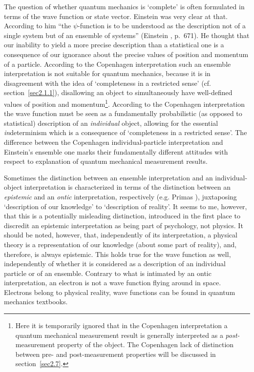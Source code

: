 \documentclass[12pt]{article}
\begin{document}
The question of whether quantum mechanics is `complete' is often
formulated in terms of the wave function or state vector. Einstein
was very clear at that. According to him ``the $\psi$-function is
to be understood as the description not of a single system but of
an ensemble of systems'' (Einstein \cite{Einstein82}, p.~671). He
thought that our inability to yield a more precise description
than a statistical one is a consequence of our ignorance about the
precise values of position and momentum of a particle. According
to the Copenhagen interpretation such an ensemble interpretation
is not suitable for quantum mechanics, because it is in
disagreement with the idea of `completeness in a restricted sense'
(cf. section~\ref{sec2.1.1}), disallowing an object to
simultaneously have well-defined values of position and
momentum\footnote{Here it is temporarily ignored that in the
Copenhagen interpretation a quantum mechanical measurement result
is generally interpreted as a {\em post-}measurement property of
the object. The Copenhagen lack of distinction between pre- and
post-measurement properties will be discussed in
section~\ref{sec2.7}.}. According to the Copenhagen interpretation
the wave function must be seen as a fundamentally probabilistic
(as opposed to statistical) description of an {\em individual}
object, allowing for the essential {\em in}determinism which is a
consequence of `completeness in a restricted sense'. The
difference between the Copenhagen individual-particle
interpretation and Einstein's ensemble one marks their
fundamentally different attitudes with respect to explanation of
quantum mechanical measurement results.

Sometimes the distinction between an ensemble interpretation and
an individual-object interpretation is characterized in terms of
the distinction between an {\em epistemic} and an {\em ontic}
interpretation, respectively (e.g. Primas \cite{Primas83}),
juxtaposing `description of our knowledge' to `description of
reality'. It seems to me, however, that this is a potentially
misleading distinction, introduced in the first place to discredit
an epistemic interpretation as being part of psychology, not
physics. It should be noted, however, that, independently of its
interpretation, a physical theory is a representation of our
knowledge (about some part of reality), and, therefore, is always
epistemic. This holds true for the wave function as well,
independently of whether it is considered as a description of an
individual particle or of an ensemble. Contrary to what is
intimated by an ontic interpretation, an electron is not a wave
function flying around in space. Electrons belong to physical
reality, wave functions can be found in quantum mechanics
textbooks.
\end{document}
